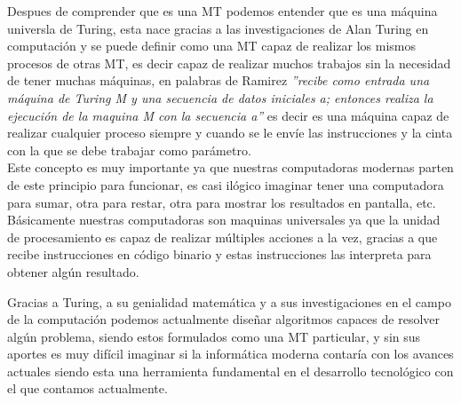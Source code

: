 	Despues de comprender que es una MT podemos entender que es una máquina universla de Turing, esta nace gracias a las investigaciones de Alan Turing en computación y se puede definir como una MT capaz de realizar los mismos procesos de otras MT, es decir capaz de realizar muchos trabajos sin la necesidad de tener muchas máquinas, en palabras de Ramirez \textit{''recibe como entrada una máquina de Turing M y una secuencia de datos iniciales a; entonces realiza la ejecución de la maquina M con la secuencia a''}\cite{ComoMaquina} es decir es una máquina capaz de realizar cualquier proceso siempre y cuando se le envíe las instrucciones y la cinta con la que se debe trabajar como parámetro.\\Este concepto es muy importante ya que nuestras computadoras modernas parten de este principio para funcionar, es casi ilógico imaginar tener una computadora para sumar, otra para restar, otra para mostrar los resultados en pantalla, etc.\\ Básicamente nuestras computadoras son maquinas universales ya que la unidad de procesamiento es capaz de realizar múltiples acciones a la vez, gracias a que recibe instrucciones en código binario y estas instrucciones las interpreta para obtener algún resultado.
	
Gracias a Turing, a su genialidad matemática y a sus investigaciones en el campo de la computación podemos actualmente diseñar algoritmos capaces de resolver algún problema, siendo estos formulados como una MT particular, y sin sus aportes es muy difícil imaginar si la informática moderna contaría con los avances actuales siendo esta una herramienta fundamental en el desarrollo tecnológico con el que contamos actualmente.
